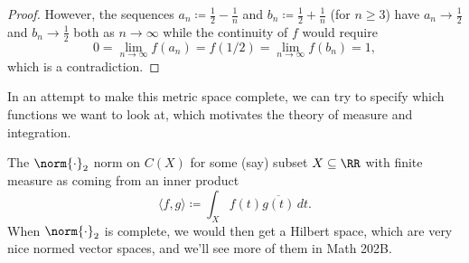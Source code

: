 \documentclass[../notes.tex]{subfiles}
\begin{document}
\begin{proof}
	However, the sequences $a_n\coloneqq\frac12-\frac1n$ and $b_n\coloneqq\frac12+\frac1n$ (for $n\ge3$) have $a_n\to\frac12$ and $b_n\to\frac12$ both as $n\to\infty$ while the continuity of $f$ would require
	\[0=\lim_{n\to\infty}f(a_n)=f(1/2)=\lim_{n\to\infty}f(b_n)=1,\]
	which is a contradiction.
\end{proof}
\begin{remark}
	In an attempt to make this metric space complete, we can try to specify which functions we want to look at, which motivates the theory of measure and integration.
\end{remark}
\begin{remark}
	The $\norm{\cdot}_2$ norm on $C(X)$ for some (say) subset $X\subseteq\RR$ with finite measure as coming from an inner product
	\[\langle f,g\rangle\coloneqq\int_Xf(t)\overline{g(t)}\,dt.\]
	When $\norm{\cdot}_2$ is complete, we would then get a Hilbert space, which are very nice normed vector spaces, and we'll see more of them in Math 202B.
\end{remark}
\end{document}

